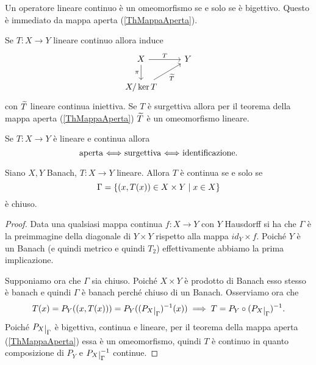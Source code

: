 \begin{remark}
Un operatore lineare continuo \`e un omeomorfismo se e solo se \`e bigettivo. Questo \`e immediato da mappa aperta (\ref{ThMappaAperta}).
\end{remark}

\begin{remark}
Se $T:X\to Y$ lineare continuo allora induce
\[\begin{tikzcd}
	X & Y \\
	{X/\ker T}
	\arrow["T", from=1-1, to=1-2]
	\arrow["\pi"', from=1-1, to=2-1]
	\arrow["{\wt T}"', from=2-1, to=1-2]
\end{tikzcd}\]
con $\widetilde{T}$ lineare continua iniettiva. Se $T$ \`e surgettiva allora per il teorema della mappa aperta (\ref{ThMappaAperta}) $\widetilde{T}$ \`e un omeomorfismo lineare.
\end{remark}

\begin{remark}
Se $T:X\to Y$ \`e lineare e continua allora
\[\text{aperta $\Longleftrightarrow$ surgettiva $\Longleftrightarrow$ identificazione.}\]
\end{remark}

\begin{theorem}\label{ThGraficoChiuso}
Siano $X,Y$ Banach, $T:X\to Y$ lineare. Allora $T$ \`e continua se e solo se
\[\Gamma=\left\{{(x,T(x))\in X\times Y\mid x\in X}\right\}\]
\`e chiuso.
\end{theorem}
\begin{proof}
Data una qualsiasi mappa continua $f:X\to Y$ con $Y$ Hausdorff si ha che $\Gamma$ \`e la preimmagine della diagonale di $Y\times Y$ rispetto alla mappa $id_Y\times f$. Poich\'e $Y$ \`e un Banach (e quindi metrico e quindi $T_2$) effettivamente abbiamo la prima implicazione.
\smallskip

Supponiamo ora che $\Gamma$ sia chiuso. Poich\'e $X\times Y$ \`e prodotto di Banach esso stesso \`e banach e quindi $\Gamma$ \`e banach perch\'e chiuso di un Banach. Osserviamo ora che
\[T(x)=P_Y((x,T(x)))=P_Y((P_X\res{\Gamma})\ii(x))\implies T=P_Y\circ(P_X\res{\Gamma})\ii.\]
Poich\'e $P_X\res{\Gamma}$ \`e bigettiva, continua e lineare, per il teorema della mappa aperta (\ref{ThMappaAperta}) essa \`e un omeomorfismo, quindi $T$ \`e continuo in quanto composizione di $P_Y$ e $P_X\res{\Gamma}\ii$ continue.
\end{proof}

